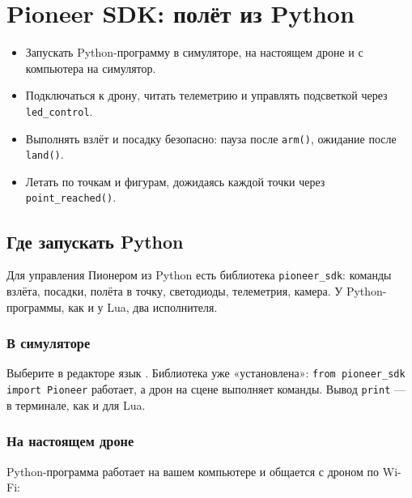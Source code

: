 \section{Pioneer SDK: полёт из Python}
\label{sec:python-sdk}

\begin{infobox}
\begin{itemize}
    \item Запускать Python-программу в симуляторе, на настоящем дроне и с компьютера на симулятор.
    \item Подключаться к дрону, читать телеметрию и управлять подсветкой через \texttt{led\_control}.
    \item Выполнять взлёт и посадку безопасно: пауза после \texttt{arm()}, ожидание после \texttt{land()}.
    \item Летать по точкам и фигурам, дожидаясь каждой точки через \texttt{point\_reached()}.
\end{itemize}
\end{infobox}

\subsection{Где запускать Python}

Для управления Пионером из Python есть библиотека \texttt{pioneer\_sdk}: команды взлёта, посадки, полёта в точку, светодиоды, телеметрия, камера. У Python-программы, как и у Lua, два исполнителя.

\subsubsection*{В симуляторе}

Выберите в редакторе язык . Библиотека уже «установлена»: \verb|from pioneer_sdk import Pioneer| работает, а дрон на сцене выполняет команды. Вывод \verb|print| --- в терминале, как и для Lua.

\begin{center}
\end{center}

\subsubsection*{На настоящем дроне}

Python-программа работает на вашем компьютере и общается с дроном по Wi-Fi:

